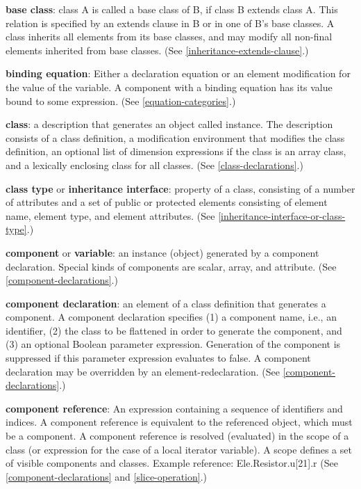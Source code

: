 \documentclass[10pt,a4paper]{report}
\begin{document}
\textbf{base class}: class A is called a base class of B, if class B
extends class A. This relation is specified by an extends clause in B or
in one of B's base classes. A class inherits all elements from its base
classes, and may modify all non-final elements inherited from base
classes. (See \ref{inheritance-extends-clause}.)

\textbf{binding equation}: Either a declaration equation or an element
modification for the value of the variable. A component with a binding
equation has its value bound to some expression. (See \ref{equation-categories}.)

\textbf{class}: a description that generates an object called instance.
The description consists of a class definition, a modification
environment that modifies the class definition, an optional list of
dimension expressions if the class is an array class, and a lexically
enclosing class for all classes. (See \ref{class-declarations}.)

\textbf{class type} or \textbf{inheritance interface}: property of a
class, consisting of a number of attributes and a set of public or
protected elements consisting of element name, element type, and element
attributes. (See \ref{inheritance-interface-or-class-type}.)

\textbf{component} or \textbf{variable}: an instance (object) generated
by a component declaration. Special kinds of components are scalar,
array, and attribute. (See \ref{component-declarations}.)

\textbf{component declaration}: an element of a class definition that
generates a component. A component declaration specifies (1) a component
name, i.e., an identifier, (2) the class to be flattened in order to
generate the component, and (3) an optional Boolean parameter
expression. Generation of the component is suppressed if this parameter
expression evaluates to false. A component declaration may be overridden
by an element-redeclaration. (See \ref{component-declarations}.)

\textbf{component reference}: An expression containing a sequence of
identifiers and indices. A component reference is equivalent to the
referenced object, which must be a component. A component reference is
resolved (evaluated) in the scope of a class (or expression for the case
of a local iterator variable). A scope defines a set of visible
  components and classes. Example reference: Ele.Resistor.u{[}21{]}.r (See
\ref{component-declarations} and \ref{slice-operation}.)
\end{document}
